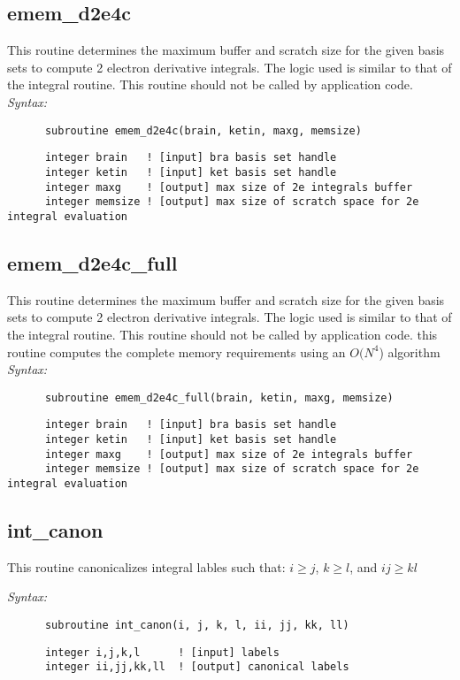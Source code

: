 \subsection{emem\_d2e4c} 
This routine determines the maximum buffer and scratch size for  
the given basis sets to compute 2 electron derivative integrals.   
The logic used is similar to that of the integral routine.   
This routine should not be called by application code. 
{\it Syntax:} 
\begin{verbatim} 
      subroutine emem_d2e4c(brain, ketin, maxg, memsize) 
\end{verbatim} 
\begin{verbatim} 
      integer brain   ! [input] bra basis set handle 
      integer ketin   ! [input] ket basis set handle 
      integer maxg    ! [output] max size of 2e integrals buffer 
      integer memsize ! [output] max size of scratch space for 2e integral evaluation 
\end{verbatim} 
\subsection{emem\_d2e4c\_full} 
This routine determines the maximum buffer and scratch size for  
the given basis sets to compute 2 electron derivative integrals.   
The logic used is similar to that of the integral routine.   
This routine should not be called by application code.  
this routine computes the complete memory requirements using 
an $O(N^4$) algorithm 
{\it Syntax:} 
\begin{verbatim} 
      subroutine emem_d2e4c_full(brain, ketin, maxg, memsize) 
\end{verbatim} 
\begin{verbatim} 
      integer brain   ! [input] bra basis set handle 
      integer ketin   ! [input] ket basis set handle 
      integer maxg    ! [output] max size of 2e integrals buffer 
      integer memsize ! [output] max size of scratch space for 2e integral evaluation 
\end{verbatim} 
\subsection{int\_canon} 
This routine canonicalizes integral lables such that: 
$i \geq j$, $k \geq l$, and $ij \geq kl$ 
 
{\it Syntax:} 
\begin{verbatim} 
      subroutine int_canon(i, j, k, l, ii, jj, kk, ll) 
\end{verbatim} 
\begin{verbatim} 
      integer i,j,k,l      ! [input] labels 
      integer ii,jj,kk,ll  ! [output] canonical labels 
\end{verbatim} 
